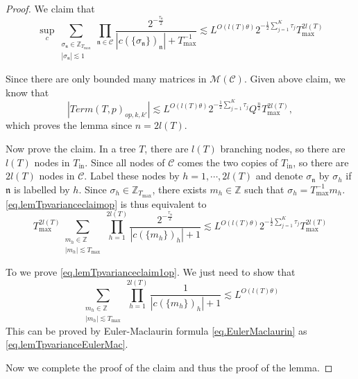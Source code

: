 \begin{proof}
We claim that 
\begin{equation}\label{eq.lemTpvarianceclaimop}
     \sup_{c}\sum_{\substack{\sigma_{\mathfrak{n}}\in \mathbb{Z}_{T_{\text{max}}}\\ |\sigma_{\mathfrak{n}}|\lesssim 1}} \prod_{\mathfrak{n}\in \mathcal{C}}\frac{2^{-\frac{\tau_{\mathfrak{n}}}{2}}}{|c(\{\sigma_{\mathfrak{n}}\})_{\mathfrak{n}}|+T^{-1}_{\text{max}}}\lesssim L^{O(l(T)\theta)}2^{-\frac{1}{2}\sum_{j=1}^K \tau_{j}} T^{2l(T)}_{\text{max}}
\end{equation}

Since there are only bounded many matrices in $\mathscr{M}(\mathcal{C})$.  Given above claim, we know that 
\begin{equation}
    |Term(T, p)_{op,k,k'}|\lesssim L^{O(l(T)\theta)} 2^{-\frac{1}{2}\sum_{j=1}^K \tau_{j}} Q^{\frac{n}{2}} T^{2l(T)}_{\text{max}},
\end{equation}
which proves the lemma since $n=2l(T)$.

Now prove the claim. In a tree $T$, there are $l(T)$ branching nodes, so there are $l(T)$ nodes in $T_{\text{in}}$. Since all nodes of $\mathcal{C}$ comes the two copies of $T_{\text{in}}$, so there are $2l(T)$ nodes in $\mathcal{C}$. Label these nodes by $h=1,\cdots,2l(T)$ and denote $\sigma_{\mathfrak{n}}$ by $\sigma_{h}$ if $\mathfrak{n}$ is labelled by $h$. Since $\sigma_{h}\in \mathbb{Z}_{T_{\text{max}}}$, there exists $m_{h}\in \mathbb{Z}$ such that $\sigma_{h}=T^{-1}_{\text{max}} m_{h}$. \eqref{eq.lemTpvarianceclaimop} is thus equivalent to 
\begin{equation}\label{eq.lemTpvarianceclaim1op}
    T^{2l(T)}_{\text{max}}\sum_{\substack{m_{h}\in \mathbb{Z}\\ |m_{h}|\lesssim T_{\text{max}}}} \prod_{h=1}^{2l(T)}\frac{2^{-\frac{\tau_{\mathfrak{n}}}{2}}}{|c(\{m_{h}\})_{h}|+1}\lesssim L^{O(l(T)\theta)}2^{-\frac{1}{2}\sum_{j=1}^K \tau_{j}} T^{2l(T)}_{\text{max}}
\end{equation}

To we prove \eqref{eq.lemTpvarianceclaim1op}. We just need to show that 
\begin{equation}
    \sum_{\substack{m_{h}\in \mathbb{Z}\\ |m_{h}|\lesssim T_{\text{max}}}} \prod_{h=1}^{2l(T)}\frac{1}{|c(\{m_{h}\})_{h}|+1}\lesssim L^{O(l(T)\theta)}
\end{equation}
This can be proved by Euler-Maclaurin formula \eqref{eq.EulerMaclaurin} as \eqref{eq.lemTpvarianceEulerMac}.

Now we complete the proof of the claim and thus the proof of the lemma.
\end{proof}


